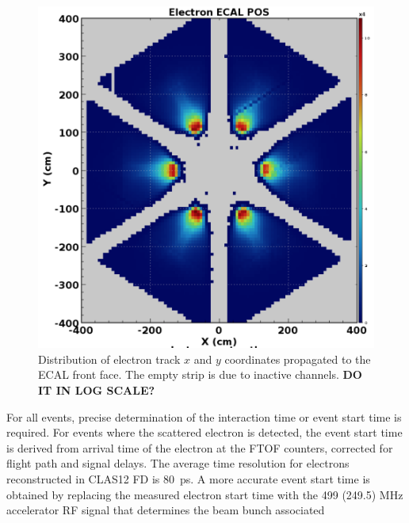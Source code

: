 \documentclass[final,3p,times,twocolumn,authoryear]{elsarticle}
\begin{document}
\begin{figure}[htbp!]
\centerline{\includegraphics[width=1.0\columnwidth]{ElectronsOnPCAL.png}}
\caption{Distribution of electron track $x$ and $y$ coordinates propagated to the ECAL front face. The empty strip 
is due to inactive channels. {\bf DO IT IN LOG SCALE?}} 
\label{electrons-xy}
\end{figure}
For all events, precise determination of the interaction time or event start time is required. For events where the scattered electron is detected, the event start time is derived from arrival time of the electron at the FTOF counters, 
corrected for flight path and signal delays.  The average time resolution for electrons reconstructed in CLAS12 FD is 80~ps. A more accurate event start time is obtained by replacing the measured 
electron start time with the 499 (249.5) MHz accelerator RF signal that determines the beam bunch associated 
\end{document}
